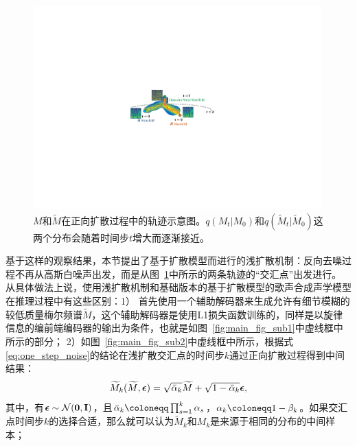 \begin{figure}[ht]
    \centering
    \includegraphics[width=0.99\textwidth]{figure/svs/manifold.pdf} %
    \caption{$M$和$\widetilde{M}$在正向扩散过程中的轨迹示意图。$q(M_t| M_0)$和$q(\widetilde{M}_t| \widetilde{M}_0)$这两个分布会随着时间步$t$增大而逐渐接近。}
    \label{fig:manifolds}
\end{figure}
基于这样的观察结果，本节提出了基于扩散模型而进行的浅扩散机制：反向去噪过程不再从高斯白噪声出发，而是从图~\ref{fig:manifolds}中所示的两条轨迹的``交汇点''出发进行。
从具体做法上说，使用浅扩散机制和基础版本的基于扩散模型的歌声合成声学模型在推理过程中有这些区别：1） 首先使用一个辅助解码器来生成允许有细节模糊的较低质量梅尔频谱$\widetilde{M}$，这个辅助解码器是使用L1损失函数训练的，同样是以旋律信息的编前端编码器的输出为条件，也就是如图~\ref{fig:main_fig_sub1}中虚线框中所示的部分；
2）如图~\ref{fig:main_fig_sub2}中虚线框中所示，根据式\eqref{eq:one_step_noise}的结论在浅扩散交汇点的时间步$k$通过正向扩散过程得到中间结果：
\begin{equation}
\widetilde{M}_k(\widetilde{M}, {\boldsymbol{\epsilon}}) = \sqrt{\bar\alpha_k}\widetilde{M} + \sqrt{1-\bar\alpha_k}{\boldsymbol{\epsilon}},
\end{equation}
其中，有${\boldsymbol{\epsilon}}\sim\mathcal{N}(\mathbf{0}, \mathbf{I})$，且$\bar\alpha_k \defeq \prod_{s=1}^k \alpha_s$，$\alpha_k \defeq 1-\beta_k$。如果交汇点时间步$k$的选择合适，那么就可以认为$\widetilde{M}_k$和$M_k$是来源于相同的分布的中间样本；

